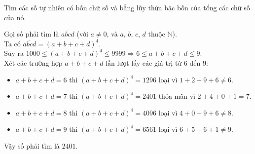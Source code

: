 \begin{bt}
 Tìm các số tự nhiên có bốn chữ số và bằng lũy thừa bậc bốn của tổng các chữ số của nó.
 \loigiai
  {
  Gọi số phải tìm là $\overline{abcd}$ (với $a \neq 0$, và $a$, $b$, $c$, $d$ thuộc $\mathbb{N}$).\\
  Ta có $\overline{abcd} = (a + b + c + d)^4$.\\
  Suy ra $1000 \leq (a + b + c + d)^4 \leq 9999 \Rightarrow 6 \leq a + b + c + d \leq 9$.\\
  Xét các trường hợp $a + b + c + d$ lần lượt lấy các giá trị từ $6$ đến $9$:
  \begin{itemize}
   \item $a + b + c + d = 6$ thì $(a + b + c + d)^4 = 1296$ loại vì $1 + 2 + 9 + 6 \neq 6$.
   \item $a + b + c + d = 7$ thì $(a + b + c + d)^4 = 2401$ thỏa mãn vì $2 + 4 + 0 + 1 = 7$.
   \item $a + b + c + d = 8$ thì $(a + b + c + d)^4 = 4096$ loại vì $4 + 0 + 9 + 6 \neq 8$.
   \item $a + b + c + d = 9$ thì $(a + b + c + d)^4 = 6561$ loại vì $6 + 5 + 6 + 1 \neq 9$.
  \end{itemize}
  Vậy số phải tìm là $2401$. 
  }
\end{bt}


